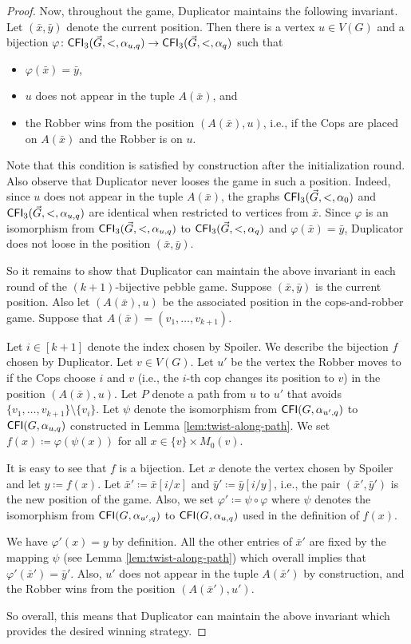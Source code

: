 \PassOptionsToPackage{dvipsnames,svgnames}{xcolor}\documentclass[10pt,a4paper]{article}
\newcommand{\CFI}{{\sf CFI}}
\begin{document}
\begin{proof}
 Now, throughout the game, Duplicator maintains the following invariant.
 Let $(\bar x,\bar y)$ denote the current position.
 Then there is a vertex $u \in V(G)$ and a bijection $\varphi\colon \CFI_3(\vec{G},<,\alpha_{u,q}) \to \CFI_3(\vec{G},<,\alpha_{q})$ such that
 \begin{itemize}
  \item $\varphi(\bar x) = \bar y$,
  \item $u$ does not appear in the tuple $A(\bar x)$, and
  \item the Robber wins from the position $(A(\bar x), u)$, i.e., if the Cops are placed on $A(\bar x)$ and the Robber is on $u$.
 \end{itemize}
 Note that this condition is satisfied by construction after the initialization round.
 Also observe that Duplicator never looses the game in such a position.
 Indeed, since $u$ does not appear in the tuple $A(\bar x)$, the graphs $\CFI_3(\vec{G},<,\alpha_0)$ and $\CFI_3(\vec{G},<,\alpha_{u,q})$ are identical when restricted to vertices from $\bar x$.
 Since $\varphi$ is an isomorphism from $\CFI_3(\vec{G},<,\alpha_{u,q})$ to $\CFI_3(\vec{G},<,\alpha_{q})$ and $\varphi(\bar x) = \bar y$, Duplicator does not loose in the position $(\bar x,\bar y)$.

 So it remains to show that Duplicator can maintain the above invariant in each round of the $(k+1)$-bijective pebble game.
 Suppose $(\bar x,\bar y)$ is the current position.
 Also let $(A(\bar x), u)$ be the associated position in the cops-and-robber game.
 Suppose that $A(\bar x) = (v_1,\dots,v_{k+1})$.

 Let $i \in [k+1]$ denote the index chosen by Spoiler.
 We describe the bijection $f$ chosen by Duplicator.
 Let $v \in V(G)$.
 Let $u'$ be the vertex the Robber moves to if the Cops choose $i$ and $v$ (i.e., the $i$-th cop changes its position to $v$) in the position $(A(\bar x),u)$.
 Let $P$ denote a path from $u$ to $u'$ that avoids $\{v_1,\dots,v_{k+1}\} \setminus \{v_i\}$.
 Let $\psi$ denote the isomorphism from $\CFI(G,\alpha_{u',q})$ to $\CFI(G,\alpha_{u,q})$ constructed in Lemma \ref{lem:twist-along-path}.
 We set $f(x) \coloneqq \varphi(\psi(x))$ for all $x \in \{v\} \times M_{0}(v)$.

 It is easy to see that $f$ is a bijection.
 Let $x$ denote the vertex chosen by Spoiler and let $y \coloneqq f(x)$.
 Let $\bar x' \coloneqq \bar x[i/x]$ and $\bar y' \coloneqq \bar y[i/y]$, i.e., the pair $(\bar x',\bar y')$ is the new position of the game.
 Also, we set $\varphi' \coloneqq \psi \circ \varphi$ where $\psi$ denotes the isomorphism from $\CFI(G,\alpha_{u',q})$ to $\CFI(G,\alpha_{u,q})$ used in the definition of $f(x)$.

 We have $\varphi'(x) = y$ by definition.
 All the other entries of $\bar x'$ are fixed by the mapping $\psi$ (see Lemma \ref{lem:twist-along-path}) which overall implies that $\varphi'(\bar x') = \bar y'$.
 Also, $u'$ does not appear in the tuple $A(\bar x')$ by construction, and the Robber wins from the position $(A(\bar x'), u')$.

 So overall, this means that Duplicator can maintain the above invariant which provides the desired winning strategy.
\end{proof}
\end{document}
